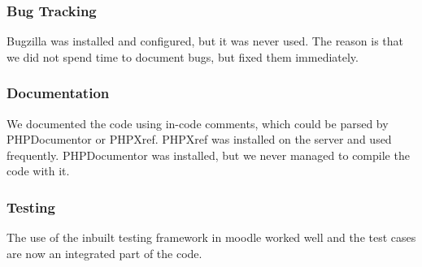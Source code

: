 \subsubsection{Bug Tracking}
Bugzilla was installed and configured, but it was never used. 
The reason is that we did not spend time to document bugs, but fixed them immediately. 

\subsubsection{Documentation}
We documented the code using in-code comments, which could be parsed by PHPDocumentor or PHPXref. 
PHPXref was installed on the server and used frequently. 
PHPDocumentor was installed, but we never managed to compile the code with it. 

\subsubsection{Testing}
The use of the inbuilt testing framework in moodle worked well and the test cases are now an integrated part of the code.






